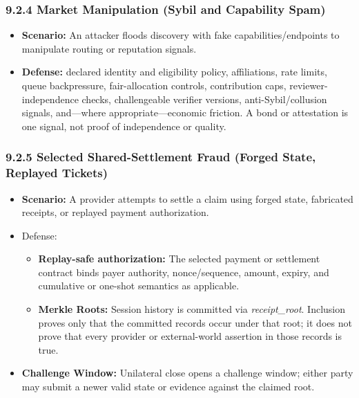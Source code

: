 \documentclass[
  11pt,
]{article}
\providecommand{\tightlist}{%
  \setlength{\itemsep}{0pt}\setlength{\parskip}{0pt}}
\begin{document}
\hypertarget{market-manipulation-sybil-and-capability-spam}{%
\subsubsection{9.2.4 Market Manipulation (Sybil and Capability
Spam)}\label{market-manipulation-sybil-and-capability-spam}}

\begin{itemize}
\tightlist
\item
  \textbf{Scenario:} An attacker floods discovery with fake
  capabilities/endpoints to manipulate routing or reputation signals.
\item
  \textbf{Defense:} declared identity and eligibility policy, affiliations,
  rate limits, queue backpressure, fair-allocation controls, contribution
  caps, reviewer-independence checks, challengeable verifier versions,
  anti-Sybil/collusion signals, and---where appropriate---economic friction.
  A bond or attestation is one signal, not proof of independence or quality.
\end{itemize}

\hypertarget{selected-shared-settlement-fraud-forged-state-replayed-tickets}{%
\subsubsection{9.2.5 Selected Shared-Settlement Fraud (Forged State, Replayed
Tickets)}\label{selected-shared-settlement-fraud-forged-state-replayed-tickets}}

\begin{itemize}
\item
  \textbf{Scenario:} A provider attempts to settle a claim using forged
  state, fabricated receipts, or replayed payment authorization.
\item
  Defense:

  \begin{itemize}
  \tightlist
  \item
    \textbf{Replay-safe authorization:} The selected payment or settlement
    contract binds payer authority, nonce/sequence, amount, expiry, and
    cumulative or one-shot semantics as applicable.
  \item
    \textbf{Merkle Roots:} Session history is committed via
    \emph{receipt\_root}. Inclusion proves only that the committed records
    occur under that root; it does not prove that every provider or
    external-world assertion in those records is true.
  \end{itemize}
\item
  \textbf{Challenge Window:} Unilateral close opens a challenge window;
  either party may submit a newer valid state or evidence against the
  claimed root.
\end{itemize}
\end{document}
